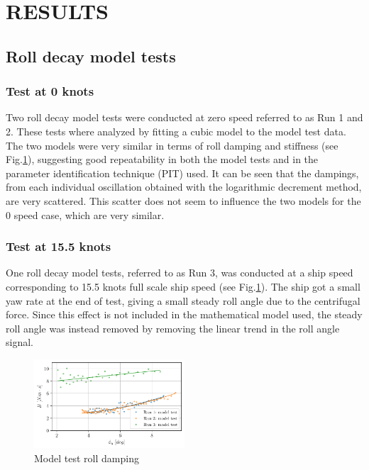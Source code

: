 \section*{RESULTS}\label{results}

    \subsection*{Roll decay model tests}\label{roll-decay-model-tests}

\subsubsection*{Test at 0 knots}\label{test-at-0-knots}

Two roll decay model tests were conducted at zero speed referred to as
Run 1 and 2.
These tests where analyzed by fitting a cubic model
to the model test data. The two models were very similar in terms of
roll damping and stiffness (see Fig.\ref{fig:mdl}), suggesting
good repeatability in both the model tests and in the parameter
identification technique (PIT) used. It can be seen that the dampings,
from each individual oscillation obtained with the logarithmic decrement
method, are very scattered. This scatter does not seem to influence the
two models for the 0 speed case, which are very similar.

    \subsubsection*{Test at 15.5 knots}\label{test-at-15.5-knots}

One roll decay model tests, referred to as Run 3, was conducted at a
ship speed corresponding to 15.5 knots full scale ship speed (see
Fig.\ref{fig:mdl}). The ship got a small yaw rate
 at the end of test, giving a small steady roll angle due to the
centrifugal force. Since this effect is not included in the mathematical
model used, the steady roll angle was instead removed by removing the
linear trend in the roll angle signal.

    

    \begin{figure}[H]
        \begin{center}\includegraphics[width = 0.5\textwidth]{figures/mdl.pdf}\end{center}
        \vspace{-1cm}
        \caption{Model test roll damping}
        \label{fig:mdl}
    \end{figure}
    
